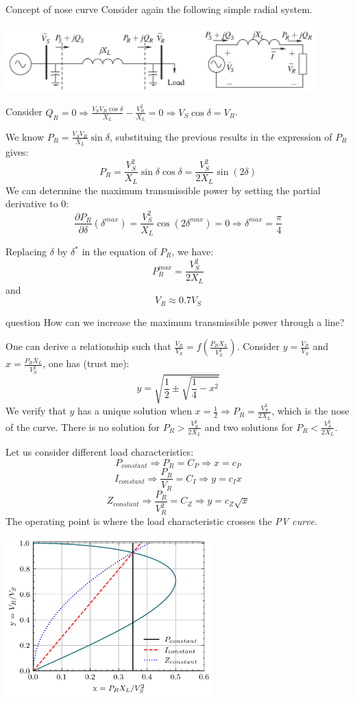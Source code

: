 \begin{frame}[allowframebreaks]{Concept of nose curve}
Consider again the following simple radial system.
\begin{center}
\includegraphics[width=0.9\textwidth]{images/RadialSystem.png}
\end{center}
Consider $Q_R = 0 \Rightarrow \frac{V_S V_R \cos \delta}{X_L} - \frac{V^2_R}{X_L} = 0 \Rightarrow V_S \cos \delta = V_R$.

We know $P_R = \frac{V_SV_R}{X_L}\sin \delta$, substituing the previous results in the expression of $P_R$ gives:
$$P_R = \frac{V_S^2}{X_L}\sin \delta \cos \delta = \frac{V_S^2}{2 X_L}\sin (2\delta)$$
We can determine the maximum transmissible power by setting the partial derivative to 0:
$$\frac{\partial P_R}{\partial \delta}(\delta^{max}) = \frac{V_S^2}{X_L}\cos (2\delta^{max}) = 0 \Rightarrow \delta^{max} = \frac{\pi}{4}$$


Replacing $\delta$ by $\delta^*$ in the equation of $P_R$, we have:
$$P_{R}^{max} = \frac{V_S^2}{2 X_L}$$
and
$$V_R \approx 0.7 V_S$$

\begin{block}{question}
    How can we increase the maximum transmissible power through a line?
\end{block}    

One can derive a relationship such that $\frac{V_R}{V_S} = f(\frac{P_R X_L}{V_S^2})$. Consider $y = \frac{V_R}{V_S}$ and $x = \frac{P_R X_L}{V_S^2}$, one has (trust me):
$$y = \sqrt{\frac{1}{2}\pm \sqrt{\frac{1}{4}-x^2}}$$
We verify that $y$ has a unique solution when $x = \frac{1}{2} \Rightarrow P_R = \frac{V_S^2}{2 X_L}$, which is the nose of the curve. There is no solution for $P_R > \frac{V_S^2}{2 X_L}$ and two solutions for $P_R < \frac{V_S^2}{2 X_L}$.


Let us consider different load characteristics:
$$P_{constant} \Rightarrow P_R = C_P \Rightarrow x = c_P$$
$$I_{constant} \Rightarrow \frac{P_R}{V_R} = C_I \Rightarrow y = c_I x$$
$$Z_{constant} \Rightarrow \frac{P_R}{V^2_R} = C_Z \Rightarrow y = c_Z \sqrt{x}$$
The operating point is where the load characteristic crosses the \emph{PV curve}.
\begin{center}
\includegraphics[width=0.6\textwidth]{images/NoseCurve.png}
\end{center}
\end{frame}


